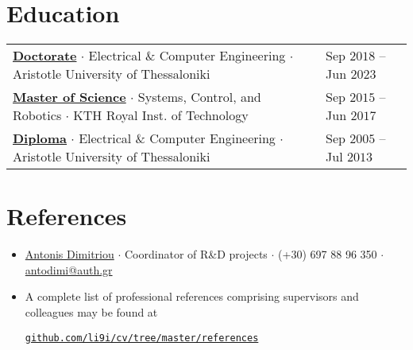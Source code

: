 \documentclass[a4paper,10pt,twoside]{article}
\begin{document}
\section{\textbf{Education}}\verticalspacebetweensectionandcontent

\begin{center}
{
\begin{tabular}{ll}
  \href{https://ikee.lib.auth.gr/record/354644}{\textbf{Doctorate}} $\cdot$ Electrical \& Computer Engineering $\cdot$ Aristotle University of Thessaloniki & {\small \textcolor{agray}{Sep $2018$ -- Jun $2023$}} \\
  \href{http://kth.diva-portal.org/smash/record.jsf?pid=diva2\%3A1102597\&dswid=2875}{\textbf{Master of Science}} $\cdot$ Systems, Control, and Robotics $\cdot$ KTH Royal Inst. of Technology & {\small \textcolor{agray}{Sep $2015$ -- Jun $2017$}} \\
  \href{https://ikee.lib.auth.gr/record/291560}{\textbf{Diploma}} $\cdot$ Electrical \& Computer Engineering $\cdot$ Aristotle University of Thessaloniki & {\small \textcolor{agray}{Sep $2005$ -- Jul $2013$}}
\end{tabular}
}
\end{center}
\verticalspacebetweensections


\section{\textbf{References}}\verticalspacebetweensectionandcontent
\begin{itemize}
  \item \href{https://gr.linkedin.com/in/antonis-dimitriou-21003452}{Antonis Dimitriou} $\cdot$ Coordinator of R\&D projects $\cdot$ (+30) 697 88 96 350 $\cdot$ \href{mailto:antodimi@auth.gr}{antodimi@auth.gr} \verticalspaceafteritem

\item A complete list of professional references comprising supervisors and colleagues may be found at\verticalspaceafteritem\vspace{0.5em}
\begin{center}\noindent
\href{https://mozilla.github.io/pdf.js/web/viewer.html?file=https://raw.githubusercontent.com/li9i/cv/master/references/references_alexandros_filotheou.pdf}{\texttt{github.com/li9i/cv/tree/master/references}}
\end{center}
\end{itemize}
\end{document}
